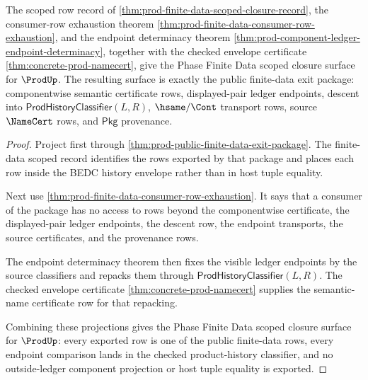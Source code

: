 \begin{theorem}
\label{thm:prod-finite-data-closure-status-record}
The scoped row record of
\autoref{thm:prod-finite-data-scoped-closure-record}, the consumer-row
exhaustion theorem
\autoref{thm:prod-finite-data-consumer-row-exhaustion}, and the endpoint
determinacy theorem
\autoref{thm:prod-component-ledger-endpoint-determinacy}, together with the
checked envelope certificate \autoref{thm:concrete-prod-namecert}, give the
Phase Finite Data scoped closure surface for $\ProdUp$. The resulting surface
is exactly the public finite-data exit package: componentwise semantic
certificate rows, displayed-pair ledger endpoints, descent into
$\mathsf{ProdHistoryClassifier}(L,R)$, $\hsame/\Cont$ transport rows, source
$\NameCert$ rows, and $\mathsf{Pkg}$ provenance.
\end{theorem}
\begin{proof}
Project first through \autoref{thm:prod-public-finite-data-exit-package}. The
finite-data scoped record identifies the rows exported by that package and
places each row inside the BEDC history envelope rather than in host tuple
equality.

Next use \autoref{thm:prod-finite-data-consumer-row-exhaustion}. It says that a
consumer of the package has no access to rows beyond the componentwise
certificate, the displayed-pair ledger endpoints, the descent row, the endpoint
transports, the source certificates, and the provenance rows.

The endpoint determinacy theorem then fixes the visible ledger endpoints by the
source classifiers and repacks them through
$\mathsf{ProdHistoryClassifier}(L,R)$. The checked envelope certificate
\autoref{thm:concrete-prod-namecert} supplies the semantic-name certificate
row for that repacking.

Combining these projections gives the Phase Finite Data scoped closure surface
for $\ProdUp$: every exported row is one of the public finite-data rows, every
endpoint comparison lands in the checked product-history classifier, and no
outside-ledger component projection or host tuple equality is exported.
\end{proof}

